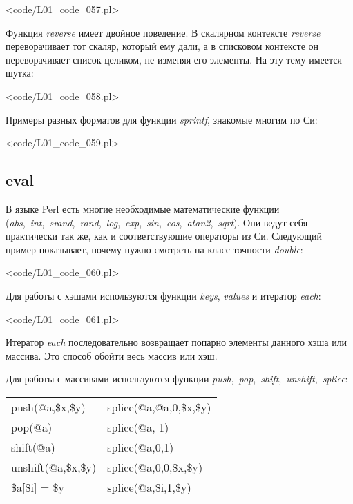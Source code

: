 \pr<code/L01_code_057.pl>

Функция \textit{reverse} имеет двойное поведение.
В скалярном контексте \textit{reverse} переворачивает тот скаляр, который ему дали, а в списковом контексте он переворачивает список целиком, не изменяя его элементы.
На эту тему имеется шутка:

\pr<code/L01_code_058.pl>

Примеры разных форматов для функции \textit{sprintf}, знакомые многим по Си:

\pr<code/L01_code_059.pl>

\subsection{eval}
В языке Perl есть многие необходимые математические функции (\textit{abs}, \textit{int}, \textit{srand}, \textit{rand}, \textit{log}, \textit{exp}, \textit{sin}, \textit{cos}, \textit{atan2}, \textit{sqrt}).
Они ведут себя практически так же, как и соответствующие операторы из Си.
Следующий пример показывает, почему нужно смотреть на класс точности \textit{double}:

\pr<code/L01_code_060.pl>

Для работы с хэшами используются функции \textit{keys}, \textit{values} и итератор \textit{each}:

\pr<code/L01_code_061.pl>
\begin{comment}
0: 1 (-1)
1: 3 (-3)
2: 2 (-2)
1: -1
3: -3
2: -2
\end{comment}

Итератор \textit{each} последовательно возвращает попарно элементы данного хэша или массива.
Это способ обойти весь массив или хэш.

Для работы с массивами используются функции \textit{push}, \textit{pop}, \textit{shift}, \textit{unshift}, \textit{splice}:

\begin{table}[H] \centering
\begin{tabular}{ll} \hline\hline
push(@a,\$x,\$y)    & splice(@a,@a,0,\$x,\$y) \\
pop(@a)             & splice(@a,-1)\\
shift(@a)           & splice(@a,0,1)\\
unshift(@a,\$x,\$y) & splice(@a,0,0,\$x,\$y)\\
\$a[\$i] = \$y      & splice(@a,\$i,1,\$y)\\
\hline\hline
\end{tabular}
\end{table}

